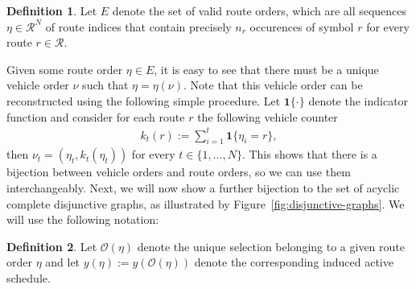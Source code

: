 \documentclass[a4paper]{report}
\theoremstyle{definition}
\newtheorem{define}{Definition}[chapter]
\theoremstyle{plain}
\begin{document}
\begin{define}
  Let $E$ denote the set of valid route orders, which are all sequences
  $\eta \in \mathcal{R}^N$ of route indices that contain precisely $n_r$
  occurences of symbol $r$ for every route $r \in \mathcal{R}$.
\end{define}

Given some route order $\eta \in E$, it is easy to see that there must be a
unique vehicle order $\nu$ such that $\eta = \eta(\nu)$.
%
Note that this vehicle order can be reconstructed using the following simple
procedure.
%
Let $\mathbf{1}\{ \cdot \}$ denote the indicator function and consider for each
route $r$ the following vehicle counter
\begin{align*}
  k_t(r) := \sum_{i=1}^t \mathbf{1} \{ \eta_i = r\} ,
\end{align*}
then $\nu_t = (\eta_t, k_t(\eta_t))$ for every $t \in \{1, \dots, N\}$.
%
This shows that there is a bijection between vehicle orders and route orders, so
we can use them interchangeably.
%
Next, we will now show a further bijection to the set of acyclic complete
disjunctive graphs, as illustrated by Figure~\ref{fig:disjunctive-graphs}.
%
We will use the following notation:

\begin{define}
  Let $\mathcal{O}(\eta)$ denote the unique selection belonging to a given route
  order $\eta$ and let $y(\eta) := y(\mathcal{O}(\eta))$ denote the corresponding
  induced active schedule.
\end{define}
\end{document}
